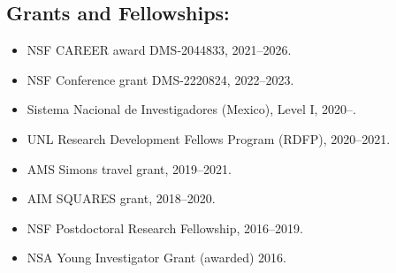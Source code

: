 \documentclass[11pt]{amsart}
\newenvironment{indentpar}[1]%
 {\begin{list}{}%
         {\setlength{\leftmargin}{#1}}%
         \item[]%
 }
 {\end{list}}
\newenvironment{inpar}
 {\begin{list}{}%
         {\setlength{\leftmargin}{5mm}}%
         \item[]%
 }
 {\end{list}}
\begin{document}
\subsection*{Grants and Fellowships:}
\begin{itemize}[leftmargin=9mm]
	\item NSF CAREER award DMS-2044833, 2021--2026.
	\item NSF Conference grant DMS-2220824, 2022--2023.
	\item Sistema Nacional de Investigadores (Mexico), Level I, 2020--.
	\item UNL Research Development Fellows Program (RDFP), 2020--2021.
	\item AMS Simons travel grant, 2019--2021.
	\item AIM SQUARES grant, 2018--2020.
	\item NSF Postdoctoral Research Fellowship, 2016--2019.
	\item NSA Young Investigator Grant (awarded) 2016.
\end{itemize}


\thispagestyle{empty}

%
%
\end{document}
